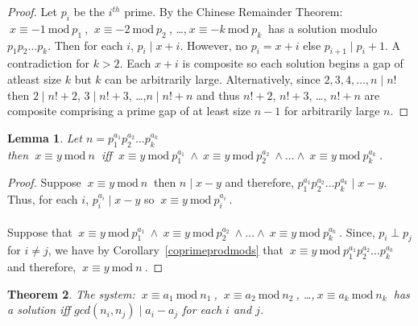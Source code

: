\documentclass[12pt]{extarticle}
\renewcommand\qedsymbol{$\square$}
\newcommand{\divides}{\mid}
\newtheorem{theorem}{Theorem}[section]
\newtheorem{lemma}[theorem]{Lemma}
\newenvironment{lproof}{\begin{proof} \renewcommand{\qedsymbol}{}}{\end{proof}}
\renewcommand{\mod}[3]{\: #1 \equiv #2 \: \mathrm{mod} \: #3 \:}
\begin{document}
\begin{lproof}
Let $p_i$ be the $i^{th}$ prime. By the Chinese Remainder Theorem: \\
$\mod{x}{-1}{p_1}$, $\mod{x}{-2}{p_2}$, \dots ,$\mod{x}{-k}{p_k}$ has a solution modulo $p_1 p_2 \dots p_k$. Then for each $i$, $p_i \divides x+i$. However, no $p_i = x+i$ else $p_{i+1} \divides p_i + 1$. A contradiction for $k > 2$. Each $x+i$ is composite so each solution begins a gap of atleast size $k$ but $k$ can be arbitrarily large.
Alternatively, since $2,3,4, \dots ,n \divides n!$ then $2 \divides n!+2$, $3 \divides n!+3$, \dots ,$n \divides n!+n$ and thus $n! + 2$, $n!+3$, \dots , $n!+n$ are composite  comprising a prime gap of at least size $n-1$ for arbitrarily large $n$.
\end{lproof}

\begin{lemma}
\label{splitcongintoprimes}
Let $n = p_1^{a_1} p_2^{a_2} \dots   p_k^{a_k}$ \\ then $\mod{x}{y}{n}$ iff $\mod{x}{y}{p_1^{a_1}} \wedge \mod{x}{y}{p_2^{a_2}} \wedge \dots \wedge \mod{x}{y}{p_k^{a_k}}$.
\end{lemma}

\begin{lproof}
Suppose $\mod{x}{y}{n}$ then $n \divides x-y$ and therefore, $p_1^{a_1}   p_2^{a_2}   \dots   p_k^{a_k} \divides x-y$. \\
Thus, for each $i$, $p_i^{a_i} \divides x-y$ so $\mod{x}{y}{p_i^{a_i}}$.\\\\
Suppose that $\mod{x}{y}{p_1^{a_1}} \wedge \mod{x}{y}{p_2^{a_2}} \wedge \dots \wedge \mod{x}{y}{p_k^{a_k}}$. Since, $p_i \perp p_j$ for $i \neq j$, we have by Corollary~\ref{coprimeprodmods} that $\mod{x}{y}{p_1^{a_1}   p_2^{a_2}   \dots   p_k^{a_k}}$ and therefore, $\mod{x}{y}{n}$.

\end{lproof}

\begin{theorem}
The system: $\mod{x}{a_1}{n_1}$, $\mod{x}{a_2}{n_2}$, \dots ,$\mod{x}{a_k}{n_k}$ has a solution iff $gcd(n_i,n_j) \divides a_i - a_j$ for each $i$ and $j$.
\end{theorem}
\end{document}
